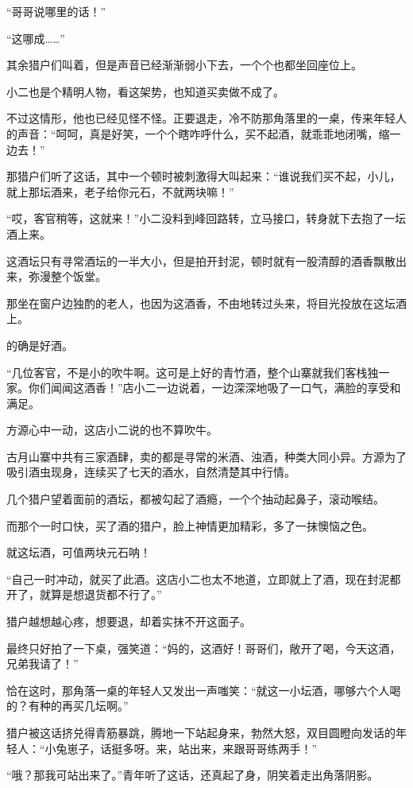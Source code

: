 \begin{this_body}
“哥哥说哪里的话！”

“这哪成……”

其余猎户们叫着，但是声音已经渐渐弱小下去，一个个也都坐回座位上。

小二也是个精明人物，看这架势，也知道买卖做不成了。

不过这情形，他也已经见怪不怪。正要退走，冷不防那角落里的一桌，传来年轻人的声音：“呵呵，真是好笑，一个个瞎咋呼什么，买不起酒，就乖乖地闭嘴，缩一边去！”

那猎户们听了这话，其中一个顿时被刺激得大叫起来：“谁说我们买不起，小儿，就上那坛酒来，老子给你元石，不就两块嘛！”

“哎，客官稍等，这就来！”小二没料到峰回路转，立马接口，转身就下去抱了一坛酒上来。

这酒坛只有寻常酒坛的一半大小，但是拍开封泥，顿时就有一股清醇的酒香飘散出来，弥漫整个饭堂。

那坐在窗户边独酌的老人，也因为这酒香，不由地转过头来，将目光投放在这坛酒上。

的确是好酒。

“几位客官，不是小的吹牛啊。这可是上好的青竹酒，整个山寨就我们客栈独一家。你们闻闻这酒香！”店小二一边说着，一边深深地吸了一口气，满脸的享受和满足。

方源心中一动，这店小二说的也不算吹牛。

古月山寨中共有三家酒肆，卖的都是寻常的米酒、浊酒，种类大同小异。方源为了吸引酒虫现身，连续买了七天的酒水，自然清楚其中行情。

几个猎户望着面前的酒坛，都被勾起了酒瘾，一个个抽动起鼻子，滚动喉结。

而那个一时口快，买了酒的猎户，脸上神情更加精彩，多了一抹懊恼之色。

就这坛酒，可值两块元石呐！

“自己一时冲动，就买了此酒。这店小二也太不地道，立即就上了酒，现在封泥都开了，就算是想退货都不行了。”

猎户越想越心疼，想要退，却着实抹不开这面子。

最终只好拍了一下桌，强笑道：“妈的，这酒好！哥哥们，敞开了喝，今天这酒，兄弟我请了！”

恰在这时，那角落一桌的年轻人又发出一声嗤笑：“就这一小坛酒，哪够六个人喝的？有种的再买几坛啊。”

猎户被这话挤兑得青筋暴跳，腾地一下站起身来，勃然大怒，双目圆瞪向发话的年轻人：“小兔崽子，话挺多呀。来，站出来，来跟哥哥练两手！”

“哦？那我可站出来了。”青年听了这话，还真起了身，阴笑着走出角落阴影。


\end{this_body}
